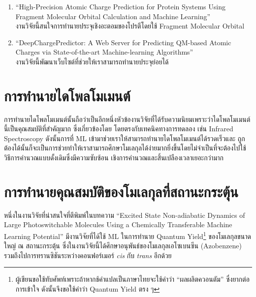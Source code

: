 \begin{enumerate}
    \item \enquote{High-Precision Atomic Charge Prediction for Protein Systems Using Fragment Molecular Orbital 
    Calculation and Machine Learning}\autocite{kato2020} \\ 
    งานวิจัยนี้สนใจการทำนายประจุเชิงอะตอมของโปรตีโดยใช้ Fragment Molecular Orbital
    
    \item \enquote{DeepChargePredictor: A Web Server for Predicting QM-based Atomic Charges via State-of-the-art 
    Machine-learning Algorithms}\autocite{wang2021} \\ 
    งานวิจัยนี้พัฒนาเว็บไซต์ที่ช่วยให้เราสามารถทำนายประจุย่อยได้
\end{enumerate}

\section{การทำนายไดโพลโมเมนต์}
\label{sec:pred_dipole_moment}

การทำนายไดโพลโมเมนต์นั้นถือว่าเป็นอีกหนึ่งหัวข้องานวิจัยที่ได้รับความนิยมเพราะว่าไดโพลโมเมนต์นี้เป็นคุณสมบัติที่สำคัญมาก ซึ่งเกี่ยวข้องโดย%
โดยตรงกับเทคนิคทางการทดลอง เช่น Infrared Spectroscopy ดังนั้นการที่ ML เข้ามาช่วยเราให้สามารถทำนายไดโพลโมเมนต์ได้รวดเร็วและ%
ถูกต้องได้นั้นก็จะเป็นการช่วยทำให้เราสามารถศึกษาโมเลกุลได้ง่ายมากยิ่งขึ้นโดยไม่จำเป็นที่จะต้องไปใช้วิธีการคำนวณแบบดั้งเดิมซึ่งมีความซับซ้อน%
เชิงการคำนวณและสิ้นเปลืองเวลาเยอะกว่ามาก\autocite{knijff2021,liu2020,pereira2018,staacke2022,sun2022,veit2020,vo2019}

\section{การทำนายคุณสมบัติของโมเลกุลที่สถานะกระตุ้น}
\label{sec:pred_ex_prop}

หนึ่งในงานวิจัยที่น่าสนใจที่ตีพิมพ์ในบทความ \enquote{Excited State Non-adiabatic Dynamics of Large Photoswitchable Molecules 
Using a Chemically Transferable Machine Learning Potential}\autocite{axelrod2022} มีงานวิจัยที่ได้ใช้ ML ในการทำนาย 
Quantum Yield\footnote{ผู้เขียนขอใช้ทับศัพท์เพราะถ้าหากช้คำแปลเป็นภาษาไทยจะใช้คำว่า \enquote{ผลผลิตควอนตัม} ซึ่งยากต่อการเข้าใจ 
ดังนั้นจึงขอใช้คำว่า Quantum Yield ตรง ๆ} ของโมเลกุลขนาดใหญ่ ณ สถานะกระตุ้น ซึ่งในงานวิจัยนี้ได้ศึกษาอนุพันธ์ของโมเลกุลเอโซเบนซีน 
(Azobenzene) รวมถึงไปการทรานซิชันระหว่างคอนฟอร์เมอร์ \textit{cis} กับ \textit{trans} อีกด้วย

